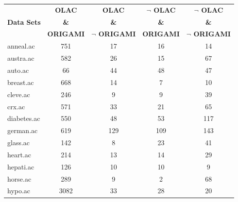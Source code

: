 \begin{table}[htbp]
	\centering
		\begin{tabular}{|l|c|c|c|c|}
		\hline
				& \textbf{OLAC}		& \textbf{OLAC}			& \textbf{$\neg$ OLAC}	& \textbf{$\neg$ OLAC}	\\
		\textbf{Data Sets}	& \textbf{\&}		& \textbf{\&}			& \textbf{\&}			& \textbf{\&}			\\
				& \textbf{ORIGAMI}	& \textbf{$\neg$ ORIGAMI}	& \textbf{ORIGAMI}		& \textbf{$\neg$ ORIGAMI}	\\
		\hline
		anneal.ac       & 751           & 17                 & 16                       & 14                            \\
		\hline
		austra.ac       & 582           & 26                 & 15                       & 67                            \\
		\hline
		auto.ac         & 66            & 44                 & 48                       & 47                            \\
		\hline
		breast.ac       & 668           & 14                 & 7                        & 10                            \\
		\hline
		cleve.ac        & 246           & 9                  & 9                        & 39                            \\
		\hline
		crx.ac          & 571           & 33                 & 21                       & 65                            \\
		\hline
		diabetes.ac     & 550           & 48                 & 53                       & 117                           \\
		\hline
		german.ac       & 619           & 129                & 109                      & 143                           \\
		\hline
		glass.ac        & 142           & 8                  & 23                       & 41                            \\
		\hline
		heart.ac        & 214           & 13                 & 14                       & 29                            \\
		\hline
		hepati.ac       & 126           & 10                 & 10                       & 9                             \\
		\hline
		horse.ac        & 289           & 9                  & 2                        & 68                            \\
		\hline
		hypo.ac         & 3082          & 33                 & 28                       & 20                            \\

\end{tabular}
\end{table}
